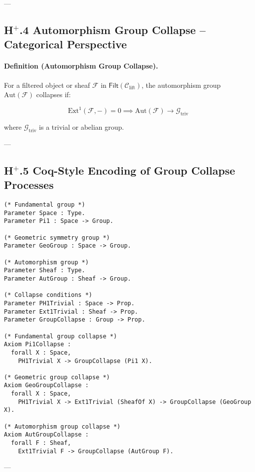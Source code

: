 \documentclass[11pt]{article}
\begin{document}
---

\subsection*{H$^{+}$.4 Automorphism Group Collapse – Categorical Perspective}

\paragraph{Definition (Automorphism Group Collapse).}

For a filtered object or sheaf $\mathcal{F}$ in $\mathsf{Filt}(\mathcal{C}_{\mathrm{lift}})$, the automorphism group $\mathrm{Aut}(\mathcal{F})$ collapses if:

\[
\mathrm{Ext}^1(\mathcal{F}, -) = 0 \implies \mathrm{Aut}(\mathcal{F}) \longrightarrow \mathcal{G}_{\mathrm{triv}}
\]

where $\mathcal{G}_{\mathrm{triv}}$ is a trivial or abelian group.

---

\subsection*{H$^{+}$.5 Coq-Style Encoding of Group Collapse Processes}

\begin{lstlisting}[language=Coq]
(* Fundamental group *)
Parameter Space : Type.
Parameter Pi1 : Space -> Group.

(* Geometric symmetry group *)
Parameter GeoGroup : Space -> Group.

(* Automorphism group *)
Parameter Sheaf : Type.
Parameter AutGroup : Sheaf -> Group.

(* Collapse conditions *)
Parameter PH1Trivial : Space -> Prop.
Parameter Ext1Trivial : Sheaf -> Prop.
Parameter GroupCollapse : Group -> Prop.

(* Fundamental group collapse *)
Axiom Pi1Collapse :
  forall X : Space,
    PH1Trivial X -> GroupCollapse (Pi1 X).

(* Geometric group collapse *)
Axiom GeoGroupCollapse :
  forall X : Space,
    PH1Trivial X -> Ext1Trivial (SheafOf X) -> GroupCollapse (GeoGroup X).

(* Automorphism group collapse *)
Axiom AutGroupCollapse :
  forall F : Sheaf,
    Ext1Trivial F -> GroupCollapse (AutGroup F).
\end{lstlisting}

---
\end{document}
